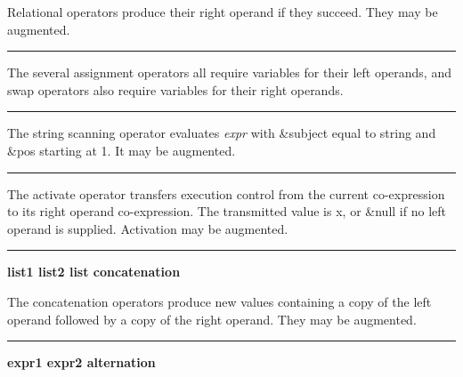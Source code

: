 \noindent
Relational operators produce their right operand if they succeed. They
may be augmented.

\bigskip\hrule\vspace{0.1cm}





\noindent The several assignment
operators all require variables for their left operands, and swap
operators also require variables for their right operands.

\bigskip\hrule\vspace{0.1cm}

\noindent
{}The string scanning operator evaluates \textit{expr}
with \textsf{\&subject} equal to string and \textsf{\&pos} starting at
1. It may be augmented.

\bigskip\hrule\vspace{0.1cm}

\noindent The activate operator transfers execution
control from the current co-expression to its right operand
co-expression. The transmitted value is \textsf{x}, or \textsf{\&null}
if no left operand is supplied. Activation may be augmented.

\bigskip\hrule\vspace{0.1cm}

\noindent
{\bf list1 {\textbar}{\textbar}{\textbar} list2 \hfill list concatenation}

\noindent The concatenation operators produce new values
containing a copy of the left operand followed by a copy of the right
operand. They may be augmented.

\bigskip\hrule\vspace{0.1cm}

\noindent
{\bf expr1 {\textbar} expr2 \hfill alternation}


